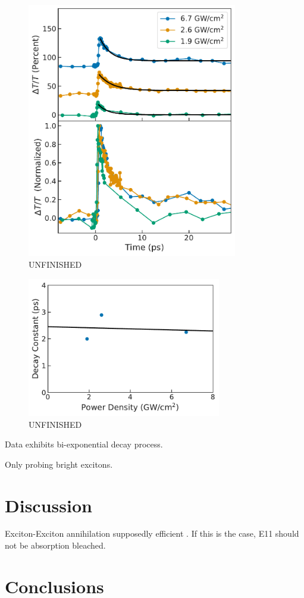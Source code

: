 \begin{figure}[ht]
	\centering
	\includegraphics[height=4.4in]{images/chapter_my_data/Jan_CNT_diff_trans_fits_and_normalized}
	\caption{{\color{red} UNFINISHED}}
\end{figure}

\begin{figure}[ht]
	\centering
	\includegraphics[height=2.4in]{images/chapter_my_data/Jan_CNT_decay_const_fit}
	\caption{{\color{red} UNFINISHED}}
\end{figure}

Data exhibits bi-exponential decay process.


Only probing bright excitons.

\clearpage

\section{Discussion}

Exciton-Exciton annihilation supposedly efficient \cite{murakami2009existence}. If this is the case, E11 should not be absorption bleached.


\section{Conclusions}
